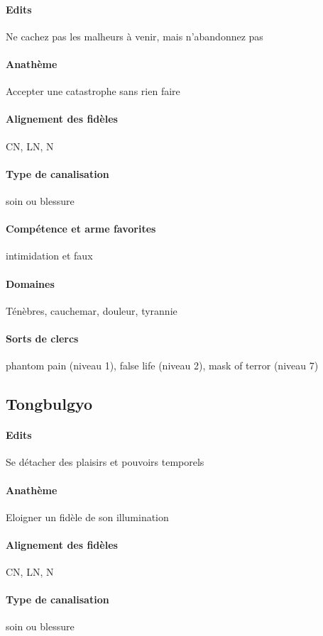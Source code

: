 \documentclass[10pt,a4paper]{book}
\begin{document}
\paragraph{Edits}Ne cachez pas les malheurs à venir, mais n'abandonnez pas
\paragraph{Anathème}Accepter une catastrophe sans rien faire
\paragraph{Alignement des fidèles}CN, LN, N
\paragraph{Type de canalisation}soin ou blessure
\paragraph{Compétence et arme favorites}intimidation et faux
\paragraph{Domaines}Ténèbres, cauchemar, douleur, tyrannie
\paragraph{Sorts de clercs}phantom pain (niveau 1), false life (niveau 2), mask of terror (niveau 7)
\subsection{Tongbulgyo}
\paragraph{Edits}Se détacher des plaisirs et pouvoirs temporels
\paragraph{Anathème}Eloigner un fidèle de son illumination
\paragraph{Alignement des fidèles} CN, LN, N
\paragraph{Type de canalisation}soin ou blessure
\end{document}
